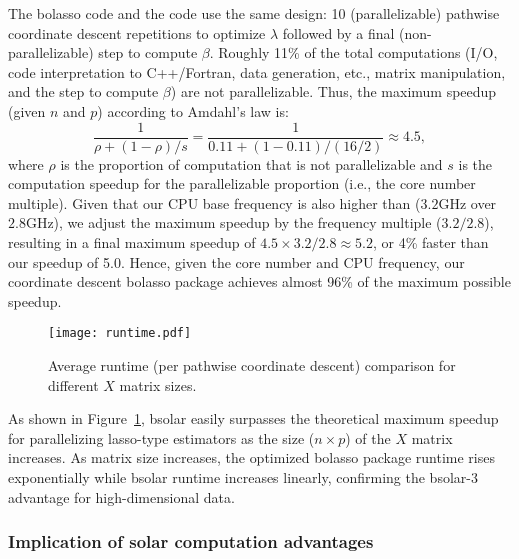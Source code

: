 \documentclass[11pt,review,authoryear]{elsarticle}
\begin{document}
The bolasso code and the \citet{friedman2010regularization} code use the same design: 10 (parallelizable) pathwise coordinate descent repetitions to optimize $\lambda$ followed by a final (non-parallelizable) step to compute $\beta$. Roughly 11\% of the total computations (I/O, code interpretation to C++/Fortran, data generation, etc., matrix manipulation, and the step to compute $\beta$) are not parallelizable. Thus, the maximum speedup (given $n$ and $p$) according to Amdahl's law is:
%
\begin{equation}
  \frac{1}{\rho + (1-\rho)/s} = \frac{1}{0.11 + (1-0.11)/(16/2)} \approx 4.5,
\end{equation}
%
where $\rho$ is the proportion of computation that is not parallelizable and $s$ is the computation speedup for the parallelizable proportion (i.e., the core number multiple). Given that our CPU base frequency is also higher than \citet{friedman2010regularization} ($3.2$GHz over $2.8$GHz), we adjust the maximum speedup by the frequency multiple ($3.2/2.8$), resulting in a final maximum speedup of $4.5 \times 3.2/2.8 \approx 5.2$, or 4\% faster than our speedup of 5.0. Hence, given the core number and CPU frequency, our coordinate descent bolasso package achieves almost 96\% of the maximum possible speedup.

\begin{figure}[ht]
  \centering
  \texttt{[image: runtime.pdf]}
  \caption{Average runtime (per pathwise coordinate descent) comparison for different $X$ matrix sizes.}
  \label{fig:runtime}
\end{figure}

As shown in Figure~\ref{fig:runtime}, bsolar easily surpasses the theoretical maximum speedup for parallelizing lasso-type estimators as the size ($n \times p$) of the $X$ matrix increases. As matrix size increases, the optimized bolasso package runtime rises exponentially while bsolar runtime increases linearly, confirming the bsolar-3 advantage for high-dimensional data.

\subsubsection{Implication of solar computation advantages}
\end{document}
